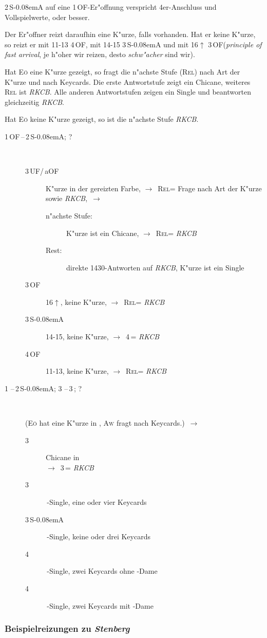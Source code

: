 \documentclass[11pt,german,twocolumn]{scrartcl}
\def\pik{\nobreak\,\Sp\xspace}
\def\coe{\nobreak\,\He\xspace}
\def\kar{\nobreak\,\Di\xspace}
\def\tre{\nobreak\,\Cl\xspace}
\def\co{\He\xspace}
\def\tr{\Cl\xspace}
\def\ra{$\rightarrow$\xspace}
\def\pl{$\uparrow$\xspace}
\def\uf{\nobreak\textsf{\,UF}\xspace}
\def\of{\nobreak\textsf{\,OF}\xspace}
\def\aof{\nobreak\textsf{\,aOF}\xspace}
\def\sa{\nobreak\textsf{S\kern-0.08emA}\xspace}
\def\SA{\nobreak\,\sa}
\def\sep{\,--\,}
\newcommand{\conv}[1]{\emph{#1}}
\def\rel{\textsc{Rel}\xspace}
\def\aw{\textsc{Aw}\xspace}
\def\eo{\textsc{E\"o}\xspace}
\def\bdsc{\begin{description}}
\def\edsc{\end{description}}
\begin{document}
2\SA auf eine 1\of-Er"offnung verspricht 4er-Anschluss und
Vollspielwerte, oder besser.

Der Er"offner reizt daraufhin eine K"urze, falls vorhanden. Hat er
keine K"urze, so reizt er mit 11-13 4\of, mit 14-15 3\SA und mit
16\pl 3\of (\conv{principle of fast arrival}, je h"oher wir reizen,
desto \emph{schw"acher} sind wir).

Hat \eo eine K"urze gezeigt, so fragt die n"achste Stufe (\rel) nach
Art der K"urze und nach Keycards.  Die erste Antwortstufe zeigt ein
Chicane, weiteres \rel ist \conv{RKCB}.  Alle anderen Antwortstufen
zeigen ein Single und beantworten gleichzeitig \conv{RKCB}.

Hat \eo keine K"urze gezeigt, so ist die n"achste Stufe \conv{RKCB}.

\bdsc
\item[1\of{}\sep2\SA; ?]~
  \bdsc
  \item[3\uf/\aof] K"urze in der gereizten Farbe, \ra~\rel = Frage
    nach Art der K"urze sowie \conv{RKCB},~\ra
    \bdsc
    \item[n"achste Stufe:] K"urze ist ein Chicane, \ra~\rel = \conv{RKCB}
    \item[Rest:] direkte 1430-Antworten auf
      \conv{RKCB}, K"urze ist ein Single
    \edsc
  \item[3\of] 16\pl, keine K"urze, \ra~\rel = \conv{RKCB}
  \item[3\SA] 14-15, keine K"urze, \ra~4\tre = \conv{RKCB}
  \item[4\of] 11-13, keine K"urze, \ra~\rel = \conv{RKCB}
  \edsc
\item[1\coe{}\sep2\SA; 3\tre{}\sep3\kar; ?]~

  (\eo hat eine K"urze in \tr, \aw fragt nach Keycards.)~\ra
  \bdsc
  \item[3\coe] Chicane in \tre\\
    \ra~3\pik = \conv{RKCB}
  \item[3\pik] \tre-Single, eine oder vier Keycards
  \item[3\SA] \tre-Single, keine oder drei Keycards
  \item[4\tre] \tre-Single, zwei Keycards ohne \co-Dame
  \item[4\kar] \tre-Single, zwei Keycards mit \co-Dame
  \edsc
\edsc

\subsubsection{Beispielreizungen zu \conv{Stenberg}}
\end{document}

